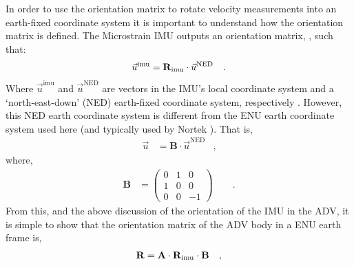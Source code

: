 In order to use the orientation matrix to rotate velocity measurements into an earth-fixed coordinate system it is important to understand how the orientation matrix is defined. The Microstrain IMU outputs an orientation matrix, \omatr, such that:
\begin{align*}
  \vec{u}^\mathrm{imu} & = \mathrm{\mathbf{R_\mathrm{imu}}} \cdot \vec{u}^\mathrm{NED} & .
\end{align*}
Where $\vec{u}^\mathrm{imu}$ and $\vec{u}^\mathrm{NED}$ are vectors in the IMU's local coordinate system and a `north-east-down' (NED) earth-fixed coordinate system, respectively \cite[]{Microstrain2012a}.  
However, this NED earth coordinate system is different from the ENU earth coordinate system used here (and typically used by Nortek \cite[]{nortek_sys_int_manual2011}).  That is,
\begin{align*}
  \vec{u} &= \mathbf{B} \cdot \vec{u}^\mathrm{NED} & ,
\end{align*}
where,
\begin{align*}
  \mathbf{B} & = 
  \left (
    \begin{array}{ccc}
      0 & 1 & 0 \\
      1 & 0 & 0 \\
      0 & 0 & -1
    \end{array}
  \right ) \qquad .
\end{align*}
From this, and the above discussion of the orientation of the IMU in the ADV, it is simple to show that the orientation matrix of the ADV body in a ENU earth frame is,
\begin{align*}
  \mathbf{R} &= \mathbf{A} \cdot \mathrm{\mathbf{R_\mathrm{imu}}} \cdot \mathbf{B} & ,
\end{align*}
